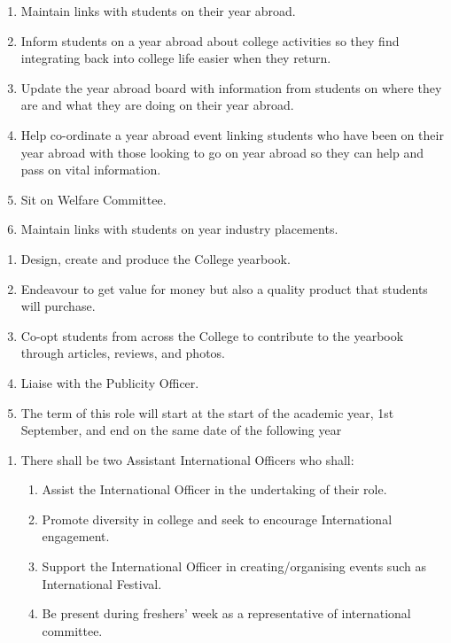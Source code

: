 \begin{enumerate}
    \item Maintain links with students on their year abroad.
    \item Inform students on a year abroad about college activities so they find integrating back into college life easier when they return.
    \item Update the year abroad board with information from students on where they are and what they are doing on their year abroad.
    \item Help co-ordinate a year abroad event linking students who have been on their year abroad with those looking to go on year abroad so they can help and pass on vital information.
    \item Sit on Welfare Committee.
    \item Maintain links with students on year industry placements.
\end{enumerate}

\begin{enumerate}
    \item Design, create and produce the College yearbook.
    \item Endeavour to get value for money but also a quality product that students will purchase.
    \item Co-opt students from across the College to contribute to the yearbook through articles, reviews, and photos.
    \item Liaise with the Publicity Officer.
    \item The term of this role will start at the start of the academic year, 1st September, and end on the same date of the following year
    
\end{enumerate}

\begin{enumerate}
    \item There shall be two Assistant International Officers who shall:
    \begin{enumerate}
        \item Assist the International Officer in the undertaking of their role.
        \item Promote diversity in college and seek to encourage International engagement.
        \item Support the International Officer in creating/organising events such as International Festival.
        \item Be present during freshers’ week as a representative of international committee. 
    \end{enumerate}
\end{enumerate}

